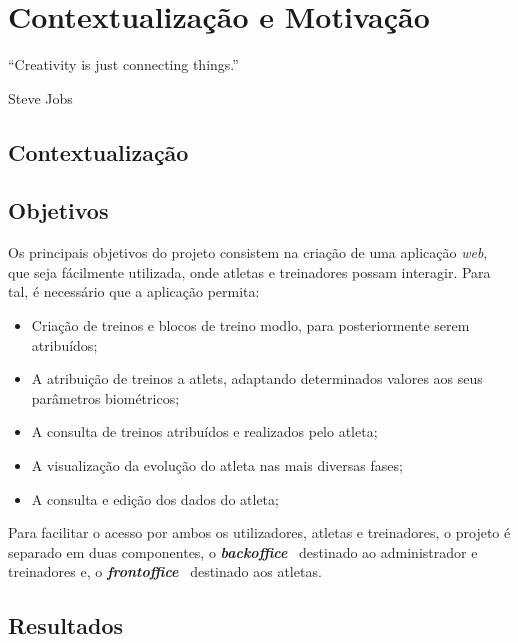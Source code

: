 \chapter{Contextualização e Motivação}

\begin{flushright}
	\begin{quotebox50}
		\large
		“Creativity is just connecting things.”

		\tcblower
		Steve Jobs
	\end{quotebox50}
\end{flushright}


\section{Contextualização}

\section{Objetivos}

Os principais objetivos do projeto consistem na criação de uma aplicação \textit{web}, que seja fácilmente utilizada, onde atletas e treinadores possam interagir. Para tal, é necessário que a aplicação permita:

\begin{itemize}
	\item Criação de treinos e blocos de treino modlo, para posteriormente serem atribuídos;
	\item A atribuição de treinos a atlets, adaptando determinados valores aos seus parâmetros biométricos;
	\item A consulta de treinos atribuídos e realizados pelo atleta;
	\item A visualização da evolução do atleta nas mais diversas fases;
	\item A consulta e edição dos dados do atleta;
\end{itemize}

Para facilitar o acesso por ambos os utilizadores, atletas e treinadores, o projeto é separado em duas componentes, o \textit{\textbf{backoffice}} \textemdash~destinado ao administrador e treinadores e, o \textbf{\textit{frontoffice}} \textemdash~destinado aos atletas.

\section{Resultados}

